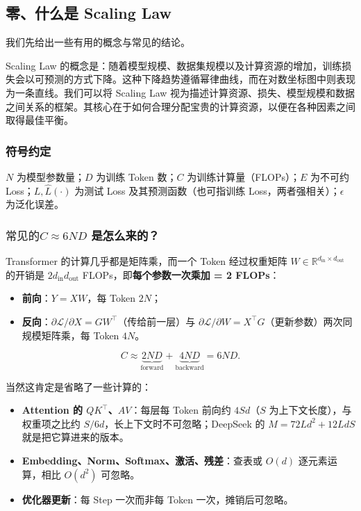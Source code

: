 \documentclass[
  11pt,
  a4paper,
  fontset=none]{ctexart}
\providecommand{\tightlist}{%
  \setlength{\itemsep}{0pt}\setlength{\parskip}{0pt}}
\newcommand{\NotesCoverEnd}{%
  \clearpage
  \pagenumbering{arabic}%
}
\begin{document}
\NotesCoverEnd

\subsection{零、什么是 Scaling
Law}\label{ux96f6ux4ec0ux4e48ux662f-scaling-law}

我们先给出一些有用的概念与常见的结论。

Scaling Law
的概念是：随着模型规模、数据集规模以及计算资源的增加，训练损失会以可预测的方式下降。这种下降趋势遵循幂律曲线，而在对数坐标图中则表现为一条直线。我们可以将
Scaling Law
视为描述计算资源、损失、模型规模和数据之间关系的框架。其核心在于如何合理分配宝贵的计算资源，以便在各种因素之间取得最佳平衡。

\subsubsection{符号约定}\label{ux7b26ux53f7ux7ea6ux5b9a}

\(N\) 为模型参数量；\(D\) 为训练 Token 数；\(C\)
为训练计算量（FLOPs）；\(E\) 为不可约 Loss；\(L,\hat L(\cdot)\) 为测试
Loss 及其预测函数（也可指训练 Loss，两者强相关）；\(\epsilon\)
为泛化误差。

\subsubsection{\texorpdfstring{\(常见的C\approx6ND\)
是怎么来的？}{常见的C\textbackslash approx6ND 是怎么来的？}}\label{ux5e38ux89c1ux7684capprox6nd-ux662fux600eux4e48ux6765ux7684}

Transformer 的计算几乎都是矩阵乘，而一个 Token 经过权重矩阵
\(W\in\mathbb R^{d_{\mathrm{in}}\times d_{\mathrm{out}}}\) 的开销是
\(2d_{\mathrm{in}}d_{\mathrm{out}}\) FLOPs，即\textbf{每个参数一次乘加 =
2 FLOPs}：

\begin{itemize}
\tightlist
\item
  \textbf{前向}：\(Y=XW\)，每 Token \(2N\)；
\item
  \textbf{反向}：\(\partial\mathcal L/\partial X=GW^\top\)（传给前一层）与
  \(\partial\mathcal L/\partial W=X^\top G\)（更新参数）两次同规模矩阵乘，每
  Token \(4N\)。
\end{itemize}

\[C\approx\underbrace{2ND}_{\text{forward}}+\underbrace{4ND}_{\text{backward}}=6ND.\]

当然这肯定是省略了一些计算的：

\begin{itemize}
\tightlist
\item
  \textbf{Attention 的 \(QK^\top\)、\(AV\)}：每层每 Token 前向约
  \(4Sd\)（\(S\) 为上下文长度），与权重项之比约
  \(S/6d\)，长上下文时不可忽略；DeepSeek 的 \(M=72Ld^2+12LdS\)
  就是把它算进来的版本。
\item
  \textbf{Embedding、Norm、Softmax、激活、残差}：查表或 \(O(d)\)
  逐元素运算，相比 \(O(d^2)\) 可忽略。
\item
  \textbf{优化器更新}：每 Step 一次而非每 Token 一次，摊销后可忽略。
\end{itemize}
\end{document}
